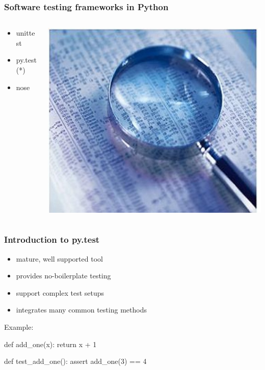 \documentclass{beamer}
\begin{document}
\begin{frame}[fragile]
    \frametitle{Software testing frameworks in Python}

    \begin{columns}
        \begin{column}[l]{0.3\textwidth}
            \begin{itemize}
                \item unittest
                \item py.test (*)
                \item nose
            \end{itemize}
        \end{column}
        \begin{column}[l]{0.5\textwidth}
            \includegraphics[scale=0.4]{images/testing.jpg}
        \end{column}
    \end{columns}
\end{frame}

\begin{frame}[fragile]
    \frametitle{Introduction to py.test}

    \begin{itemize}
        \item mature, well supported tool
        \item provides no-boilerplate testing
        \item support complex test setups
        \item integrates many common testing methods
    \end{itemize}
    \pause
    Example:
    \begin{python}
def add_one(x):
    return x + 1

def test_add_one():
    assert add_one(3) == 4
    \end{python}
\end{frame}
\end{document}
